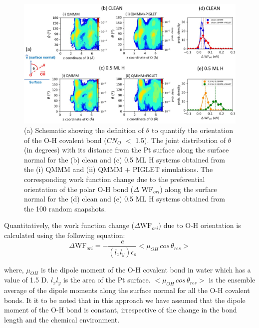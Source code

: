 \begin{figure}
   \begin{center}
    \includegraphics[width=15cm]{./Chapter3/figures/Slide3.JPG}       
   \end{center}
    \caption{(a) Schematic showing the definition of $\theta$ to quantify the orientation of the O-H covalent bond ($CN_O$ $<$ 1.5). The joint distribution of $\theta$ (in degrees) with its distance from the Pt surface along the surface normal for the (b) clean and (c) 0.5 ML H systems obtained from the (i) QMMM and (ii) QMMM $+$ PIGLET simulations. The corresponding work function change due to the preferential orientation of the polar O-H bond ($\Delta$ WF$_{ori}$) along the surface normal for the (d) clean and (e) 0.5 ML H systems obtained from the 100 random snapshots.}
  \label{fig:Slide3}
\end{figure}

Quantitatively, the work function change ($\Delta \textrm{WF}_{ori}$) due to O-H orientation is calculated using the following equation\cite{li2021establishment}:
\begin{equation}
    \label{wf_ori}
    \Delta \textrm{WF}_{ori}  =  -\frac{e}{(l_xl_y)\epsilon_o } <\mu_{OH}\, cos \,\theta_{res}>
\end{equation}

\noindent where, $\mu_{OH}$ is the dipole moment of the O-H covalent bond in water which has a value of 1.5 D\cite{tuckerman1997quantum}. $l_xl_y$ is the area of the Pt surface. $<\mu_{OH}\, cos \,\theta_{res}>$ is the ensemble average of the dipole moments along the surface normal for all the O-H covalent bonds.
It it to be noted that in this approach we have assumed that the dipole moment
of the O-H bond is constant, irrespective of the change in the bond length
and the chemical environment.

